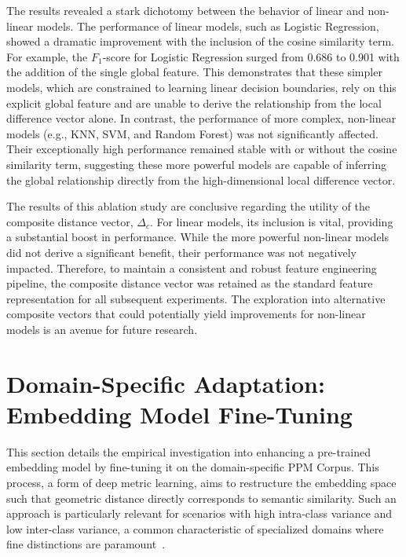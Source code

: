 The results revealed a stark dichotomy between the behavior of linear and non-linear models. The performance of linear models, such as Logistic Regression, showed a dramatic improvement with the inclusion of the cosine similarity term. For example, the \(F_1\)-score for Logistic Regression surged from 0.686 to 0.901 with the addition of the single global feature. This demonstrates that these simpler models, which are constrained to learning linear decision boundaries, rely on this explicit global feature and are unable to derive the relationship from the local difference vector alone. In contrast, the performance of more complex, non-linear models (e.g., KNN, SVM, and Random Forest) was not significantly affected. Their exceptionally high performance remained stable with or without the cosine similarity term, suggesting these more powerful models are capable of inferring the global relationship directly from the high-dimensional local difference vector.

The results of this ablation study are conclusive regarding the utility of the composite distance vector, \(\Delta_c\). For linear models, its inclusion is vital, providing a substantial boost in performance. While the more powerful non-linear models did not derive a significant benefit, their performance was not negatively impacted. Therefore, to maintain a consistent and robust feature engineering pipeline, the composite distance vector was retained as the standard feature representation for all subsequent experiments. The exploration into alternative composite vectors that could potentially yield improvements for non-linear models is an avenue for future research.

\section{Domain-Specific Adaptation: Embedding Model Fine-Tuning}\label{ch:4.4}
This section details the empirical investigation into enhancing a pre-trained embedding model by fine-tuning it on the domain-specific PPM Corpus. This process, a form of deep metric learning, aims to restructure the embedding space such that geometric distance directly corresponds to semantic similarity. Such an approach is particularly relevant for scenarios with high intra-class variance and low inter-class variance, a common characteristic of specialized domains where fine distinctions are paramount~\cite{mohan2023deepmetriclearningcomputer}.

